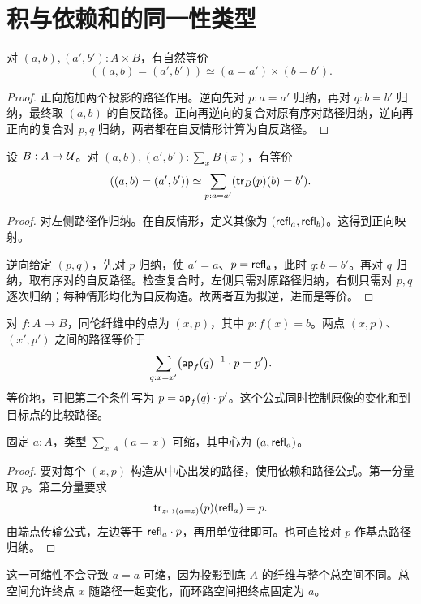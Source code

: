 \section{积与依赖和的同一性类型}
\begin{theorem}[积中的路径]
对 $(a,b),(a',b'):A\times B$，有自然等价
\[
((a,b)=(a',b'))\simeq(a=a')\times(b=b').
\]
\end{theorem}
\begin{proof}
正向施加两个投影的路径作用。逆向先对 $p:a=a'$ 归纳，再对 $q:b=b'$ 归纳，最终取 $(a,b)$ 的自反路径。正向再逆向的复合对原有序对路径归纳，逆向再正向的复合对 $p,q$ 归纳，两者都在自反情形计算为自反路径。
\end{proof}
\begin{theorem}[依赖和中的路径]\label{thm:sigma-path}
设 $B:A\to\mathcal U$。对 $(a,b),(a',b'):\sum_xB(x)$，有等价
\[
((a,b)=(a',b'))
\simeq\sum_{p:a=a'}(\mathsf{tr}_B(p)(b)=b').
\]
\end{theorem}
\begin{proof}
对左侧路径作归纳。在自反情形，定义其像为 $(\mathsf{refl}_a,\mathsf{refl}_b)$。这得到正向映射。

逆向给定 $(p,q)$，先对 $p$ 归纳，使 $a'=a$、$p=\mathsf{refl}_a$，此时 $q:b=b'$。再对 $q$ 归纳，取有序对的自反路径。检查复合时，左侧只需对原路径归纳，右侧只需对 $p,q$ 逐次归纳；每种情形均化为自反构造。故两者互为拟逆，进而是等价。
\end{proof}
\begin{example}[同伦纤维中的路径]
对 $f:A\to B$，同伦纤维中的点为 $(x,p)$，其中 $p:f(x)=b$。两点 $(x,p)$、$(x',p')$ 之间的路径等价于
\[
\sum_{q:x=x'}\bigl(\mathsf{ap}_f(q)^{-1}\cdot p=p'\bigr).
\]
等价地，可把第二个条件写为 $p=\mathsf{ap}_f(q)\cdot p'$。这个公式同时控制原像的变化和到目标点的比较路径。
\end{example}
\begin{proposition}[基点路径总空间可缩]\label{prop:based-contractible}
固定 $a:A$，类型 $\sum_{x:A}(a=x)$ 可缩，其中心为 $(a,\mathsf{refl}_a)$。
\end{proposition}
\begin{proof}
要对每个 $(x,p)$ 构造从中心出发的路径，使用依赖和路径公式。第一分量取 $p$。第二分量要求
\[
\mathsf{tr}_{z\mapsto(a=z)}(p)(\mathsf{refl}_a)=p.
\]
由端点传输公式，左边等于 $\mathsf{refl}_a\cdot p$，再用单位律即可。也可直接对 $p$ 作基点路径归纳。
\end{proof}
\begin{remark}
这一可缩性不会导致 $a=a$ 可缩，因为投影到底 $A$ 的纤维与整个总空间不同。总空间允许终点 $x$ 随路径一起变化，而环路空间把终点固定为 $a$。
\end{remark}


